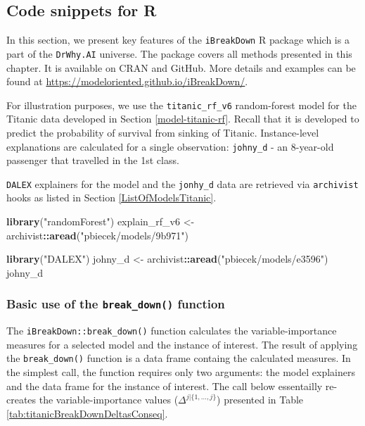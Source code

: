 \documentclass[12pt,]{krantz}
\newenvironment{Shaded}{\begin{snugshade}}{\end{snugshade}}
\newcommand{\KeywordTok}[1]{\textcolor[rgb]{0.13,0.29,0.53}{\textbf{#1}}}
\newcommand{\NormalTok}[1]{#1}
\newcommand{\OperatorTok}[1]{\textcolor[rgb]{0.81,0.36,0.00}{\textbf{#1}}}
\newcommand{\StringTok}[1]{\textcolor[rgb]{0.31,0.60,0.02}{#1}}
\begin{document}
\hypertarget{BDR}{%
\subsection{Code snippets for R}\label{BDR}}

In this section, we present key features of the \texttt{iBreakDown} R package \citep{iBreakDownRPackage} which is a part of the \texttt{DrWhy.AI} universe. The package covers all methods presented in this chapter. It is available on CRAN and GitHub. More details and examples can be found at \url{https://modeloriented.github.io/iBreakDown/}.

For illustration purposes, we use the \texttt{titanic\_rf\_v6} random-forest model for the Titanic data developed in Section \ref{model-titanic-rf}. Recall that it is developed to predict the probability of survival from sinking of Titanic. Instance-level explanations are calculated for a single observation: \texttt{johny\_d} - an 8-year-old passenger that travelled in the 1st class.

\texttt{DALEX} explainers for the model and the \texttt{jonhy\_d} data are retrieved via \texttt{archivist} hooks as listed in Section \ref{ListOfModelsTitanic}.

\begin{Shaded}
\begin{Highlighting}[]
\KeywordTok{library}\NormalTok{(}\StringTok{"randomForest"}\NormalTok{)}
\NormalTok{explain_rf_v6 <-}\StringTok{ }\NormalTok{archivist}\OperatorTok{::}\KeywordTok{aread}\NormalTok{(}\StringTok{"pbiecek/models/9b971"}\NormalTok{)}

\KeywordTok{library}\NormalTok{(}\StringTok{"DALEX"}\NormalTok{)}
\NormalTok{johny_d <-}\StringTok{ }\NormalTok{archivist}\OperatorTok{::}\KeywordTok{aread}\NormalTok{(}\StringTok{"pbiecek/models/e3596"}\NormalTok{)}
\NormalTok{johny_d}
\end{Highlighting}
\end{Shaded}

\hypertarget{basic-use-of-the-break_down-function}{%
\subsubsection{\texorpdfstring{Basic use of the \texttt{break\_down()} function}{Basic use of the break\_down() function}}\label{basic-use-of-the-break_down-function}}

The \texttt{iBreakDown::break\_down()} function calculates the variable-importance measures for a selected model and the instance of interest. The result of applying the \texttt{break\_down()} function is a data frame containg the calculated measures. In the simplest call, the function requires only two arguments: the model explainers and the data frame for the instance of interest. The call below essentailly re-creates the variable-importance values (\(\Delta^{j|\{1,\ldots,j\}}\)) presented in Table \ref{tab:titanicBreakDownDeltasConseq}.
\end{document}

